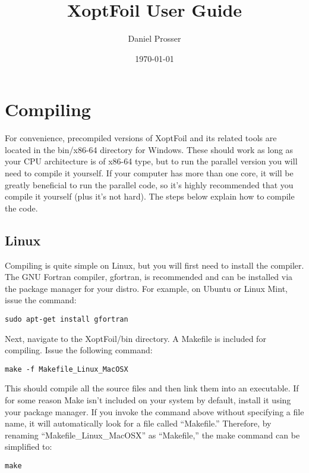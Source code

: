 \documentclass[11pt]{article}
\begin{document}
\title{XoptFoil User Guide}
\author{Daniel Prosser}
\date{\today}
\maketitle

\tableofcontents

\section{Compiling}

For convenience, precompiled versions of XoptFoil and its related tools are
located in the bin/x86-64 directory for Windows. These should work as long as
your CPU architecture is of x86-64 type, but to run the parallel version you will need to
compile it yourself. If your computer has more than one core, it will be greatly
beneficial to run the parallel code, so it's highly recommended that you compile it
yourself (plus it's not hard). The steps below explain how to compile the code.

\subsection{Linux}

Compiling is quite simple on Linux, but you will first need to install the compiler. The
GNU Fortran compiler, gfortran, is recommended and can be installed via the package
manager for your distro.  For example, on Ubuntu or Linux Mint, issue the command:

\begin{verbatim}
sudo apt-get install gfortran
\end{verbatim}

Next, navigate to the XoptFoil/bin directory.  A Makefile is included for compiling. Issue
the following command:

\begin{verbatim}
make -f Makefile_Linux_MacOSX
\end{verbatim}

This should compile all the source files and then link them into an executable.  If for
some reason Make isn't included on your system by default, install it using your package 
manager. If you invoke the command above without specifying a file name, it will 
automatically look
for a file called ``Makefile.''  Therefore, by renaming ``Makefile\_Linux\_MacOSX'' as
``Makefile,'' the make command can be simplified to:

\begin{verbatim}
make
\end{verbatim}
\end{document}
